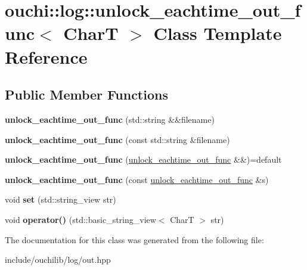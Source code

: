 \hypertarget{classouchi_1_1log_1_1unlock__eachtime__out__func}{}\section{ouchi\+::log\+::unlock\+\_\+eachtime\+\_\+out\+\_\+func$<$ CharT $>$ Class Template Reference}
\label{classouchi_1_1log_1_1unlock__eachtime__out__func}
\subsection*{Public Member Functions}
\begin{DoxyCompactItemize}
\item 
\mbox{\label{classouchi_1_1log_1_1unlock__eachtime__out__func_af476f1f3b0ec428738f914ec259431c1}} 
{\bfseries unlock\+\_\+eachtime\+\_\+out\+\_\+func} (std\+::string \&\&filename)
\item 
\mbox{\label{classouchi_1_1log_1_1unlock__eachtime__out__func_a21a20842a4b33d63effd5bfa12e75c7d}} 
{\bfseries unlock\+\_\+eachtime\+\_\+out\+\_\+func} (const std\+::string \&filename)
\item 
\mbox{\label{classouchi_1_1log_1_1unlock__eachtime__out__func_abe28e460920f63c70b5056acb79c44d3}} 
{\bfseries unlock\+\_\+eachtime\+\_\+out\+\_\+func} (\mbox{\hyperlink{classouchi_1_1log_1_1unlock__eachtime__out__func}{unlock\+\_\+eachtime\+\_\+out\+\_\+func}} \&\&)=default
\item 
\mbox{\label{classouchi_1_1log_1_1unlock__eachtime__out__func_a7d8c35ddd8d92692a0340655cbde417d}} 
{\bfseries unlock\+\_\+eachtime\+\_\+out\+\_\+func} (const \mbox{\hyperlink{classouchi_1_1log_1_1unlock__eachtime__out__func}{unlock\+\_\+eachtime\+\_\+out\+\_\+func}} \&s)
\item 
\mbox{\label{classouchi_1_1log_1_1unlock__eachtime__out__func_a230707f39911d7e4ea845d98f33c7d34}} 
void {\bfseries set} (std\+::string\+\_\+view str)
\item 
\mbox{\label{classouchi_1_1log_1_1unlock__eachtime__out__func_ae726d025da41bd2c6579541994ff3e5c}} 
void {\bfseries operator()} (std\+::basic\+\_\+string\+\_\+view$<$ CharT $>$ str)
\end{DoxyCompactItemize}


The documentation for this class was generated from the following file\+:\begin{DoxyCompactItemize}
\item 
include/ouchilib/log/out.\+hpp\end{DoxyCompactItemize}
